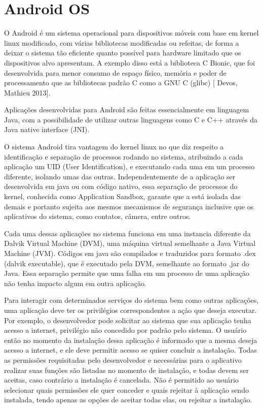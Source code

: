 \chapter{Android OS}
\label{cap:android-os}

O Android é um sistema operacional para dispositivos móveis com base em kernel linux modificado, com várias bibliotecas modificadas ou refeitas, de forma a deixar o sistema tão eficiente quanto possível para hardware limitado que os dispositivos alvo apresentam. A exemplo disso está a biblioteca C Bionic, que foi desenvolvida para menor consumo de espaço físico, memória e poder de processamento que as bibliotecas padrão C como a GNU C (glibc) [ Devos, Mathieu 2013]. 

Aplicações desenvolvidas para Android são feitas essencialmente em linguagem Java, com a possibilidade de utilizar outras linguagens como C e C++ através da Java native interface (JNI). 

O sistema Android tira vantagem do kernel linux no que diz respeito a identificação e separação de processos rodando no sistema, atribuindo a cada aplicação um UID (User Identification), e executando cada uma em um processo diferente, isolando umas das outras.  Independentemente de a aplicação ser desenvolvida em java ou com código nativo, essa separação de processos do kernel, conhecida como Application Sandbox, garante que a está isolada das demais e portanto sujeita aos mesmos mecanismos de segurança inclusive que os aplicativos do sistema, como contatos, câmera, entre outros. 

Cada uma dessas aplicações no sistema funciona em uma instancia diferente da Dalvik Virtual Machine (DVM), uma máquina virtual semelhante a Java Virtual Machine (JVM). Códigos em java são compilados e traduzidos para formato .dex (dalvik executable), que é executado pela DVM, semelhante ao formato .jar do Java. Essa separação permite que uma falha em um processo de uma aplicação não tenha impacto algum em outra aplicação. 

Para interagir com determinados serviços do sistema bem como outras aplicações, uma aplicação deve ter os privilégios correspondentes a ação que deseja executar. Por exemplo, o desenvolvedor pode solicitar ao sistema que sua aplicação tenha acesso a internet, privilégio não concedido por padrão pelo sistema. O usuário então no momento da instalação dessa aplicação é informado que a mesma deseja acesso a internet, e ele deve permitir acesso se quiser concluir a instalação. Todas as permissões requisitadas pelo desenvolvedor e necessárias para o aplicativo realizar suas funções são listadas no momento de instalação, e todas devem ser aceitas, caso contrário a instalação é cancelada. Não é permitido ao usuário selecionar quais permissões ele quer conceder e quais rejeitar à aplicação sendo instalada, tendo apenas as opções de aceitar todas elas, ou rejeitar a instalação. 

